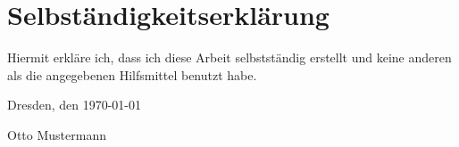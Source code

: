 
\section*{\vfill{} \thispagestyle{empty}
Selbständigkeitserklärung}

Hiermit erkläre ich, dass ich diese Arbeit selbstständig erstellt
und keine anderen als die angegebenen Hilfsmittel benutzt habe.
\bigskip{}

\noindent Dresden, den \today %
\vspace{2.5cm}

\noindent Otto Mustermann \cleardoublepage{}

